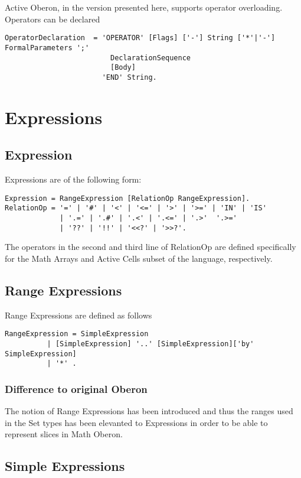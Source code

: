 \documentclass[a4wide,11pt]{article}
\begin{document}
Active Oberon, in the version presented here, supports operator overloading. Operators can be declared 

\begin{lstlisting}[style=ebnf]
OperatorDeclaration  = 'OPERATOR' [Flags] ['-'] String ['*'|'-'] FormalParameters ';'
                         DeclarationSequence
                         [Body]
                       'END' String.
\end{lstlisting}




\section{Expressions}

\subsection{Expression}

Expressions are of the following form:
\begin{lstlisting}[style=ebnf]
Expression = RangeExpression [RelationOp RangeExpression].
RelationOp = '=' | '#' | '<' | '<=' | '>' | '>=' | 'IN' | 'IS'
             | '.=' | '.#' | '.<' | '.<=' | '.>'  '.>='
             | '??' | '!!' | '<<?' | '>>?'.
\end{lstlisting}
The operators in the second and third line of RelationOp are defined specifically for the Math Arrays and Active Cells subset of the language, respectively.

\subsection{Range Expressions}
Range Expressions are defined as follows
\begin{lstlisting}[style=ebnf]
RangeExpression = SimpleExpression
          | [SimpleExpression] '..' [SimpleExpression]['by' SimpleExpression]
          | '*' .
\end{lstlisting}

\subsubsection{Difference to original Oberon}
The notion of Range Expressions has been introduced and thus the ranges used in the Set types has been elevanted to Expressions in order to be able to represent slices in Math Oberon.

\subsection{Simple Expressions}
\end{document}
